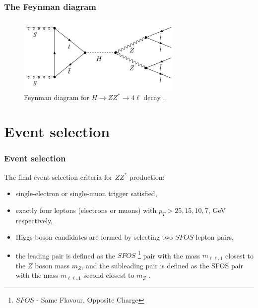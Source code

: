 \documentclass[aspectratio=1610, english]{beamer}
\newcommand{\hzz}{ H\rightarrow ZZ^{*}\rightarrow 4 \ell}
\begin{document}
\begin{frame}
\frametitle{The Feynman diagram}

\begin{figure} [H]
\centering
\includegraphics[width=8cm]{feynman_diagram.png}
\caption{Feynman diagram for $\hzz$ decay \cite{diagram}. }
\end{figure}

\end{frame}

\section{Event selection}

\begin{frame}
\frametitle{Event selection}
The final event-selection criteria for $ZZ^*$ production:

\begin{itemize}
\item single-electron or single-muon trigger satisfied,
\item exactly four leptons (electrons or muons) with $p_T>25, 15, 10, 7$, GeV respectively,
\item Higgs-boson candidates are formed by selecting two $SFOS$ lepton pairs,
\item the leading pair is defined as the $SFOS$ \footnote{$SFOS$ - Same Flavour, Opposite Charge} pair with the mass $m_{\ell \ell, 1}$ closest to the $Z$ boson mass $m_Z$, and the subleading pair is defined as the SFOS pair with the mass $m_{\ell \ell, 1}$ second closest to $m_Z$ \cite{opendata}.

\end{itemize}

\end{frame}
\end{document}
